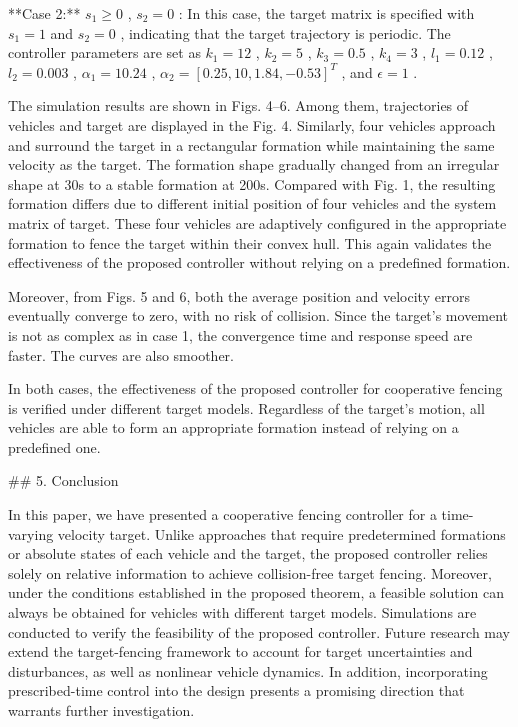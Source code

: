 **Case 2:**  $s_1 \geq 0$ ,  $s_2 = 0$ : In this case, the target matrix is specified with  $s_1 = 1$  and  $s_2 = 0$ , indicating that the target trajectory is periodic. The controller parameters are set as  $k_1 = 12$ ,  $k_2 = 5$ ,  $k_3 = 0.5$ ,  $k_4 = 3$ ,  $l_1 = 0.12$ ,  $l_2 = 0.003$ ,  $\alpha_1 = 10.24$ ,  $\alpha_2 = [0.25, 10, 1.84, -0.53]^T$ , and  $\epsilon = 1$ .

The simulation results are shown in Figs. 4–6. Among them, trajectories of vehicles and target are displayed in the Fig. 4. Similarly, four vehicles approach and surround the target in a rectangular formation while maintaining the same velocity as the target. The formation shape gradually changed from an irregular shape at 30s to a stable formation at 200s. Compared with Fig. 1, the resulting formation differs due to different initial position of four vehicles and the system matrix of target. These four vehicles are adaptively configured in the appropriate formation to fence the target within their convex hull. This again validates the effectiveness of the proposed controller without relying on a predefined formation.

Moreover, from Figs. 5 and 6, both the average position and velocity errors eventually converge to zero, with no risk of collision. Since the target's movement is not as complex as in case 1, the convergence time and response speed are faster. The curves are also smoother.

In both cases, the effectiveness of the proposed controller for cooperative fencing is verified under different target models. Regardless of the target's motion, all vehicles are able to form an appropriate formation instead of relying on a predefined one.

## 5. Conclusion

In this paper, we have presented a cooperative fencing controller for a time-varying velocity target. Unlike approaches that require predetermined formations or absolute states of each vehicle and the target, the proposed controller relies solely on relative information to achieve collision-free target fencing. Moreover, under the conditions established in the proposed theorem, a feasible solution can always be obtained for vehicles with different target models. Simulations are conducted to verify the feasibility of the proposed controller. Future research may extend the target-fencing framework to account for target uncertainties and disturbances, as well as nonlinear vehicle dynamics. In addition, incorporating prescribed-time control into the design presents a promising direction that warrants further investigation.

